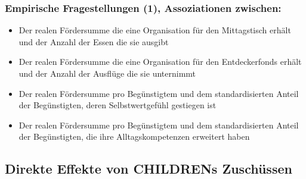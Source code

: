 \begin{frame}[fragile]
\frametitle{Empirische Fragestellungen (1), Assoziationen zwischen:}
\begin{itemize}
\item Der realen Fördersumme die eine Organisation für den Mittagstisch erhält und der Anzahl der Essen die sie ausgibt
\item Der realen Fördersumme die eine Organisation für den Entdeckerfonds erhält und der Anzahl der Ausflüge die sie unternimmt
\item Der realen Fördersumme pro Begünstigtem und dem standardisierten Anteil der Begünstigten, deren Selbstwertgefühl gestiegen ist
\item Der realen Fördersumme pro Begünstigtem und dem standardisierten Anteil der Begünstigten, die ihre Alltagskompetenzen erweitert haben
\end{itemize}
\end{frame}


\subsection{Direkte Effekte von CHILDRENs Zuschüssen}

